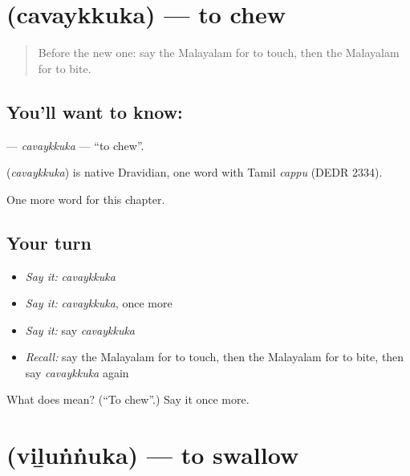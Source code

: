 \section[\texorpdfstring{\ml{ചവയ്ക്കുക} (cavaykkuka)}{ചവയ്ക്കുക (cavaykkuka)}]{ (cavaykkuka) — to chew}

\label{lesson:ML-C266-cavaykkuka}



\begin{quote}
Before the new one: say the Malayalam for to touch, then the Malayalam for to bite.
\end{quote}

\subsection*{You'll want to know: }
\textbf{} — \emph{cavaykkuka} — \textquotedblleft{}to chew\textquotedblright{}.

\begin{cousinweb}
\textbf{} (\emph{cavaykkuka}) is native Dravidian, one word with Tamil \emph{cappu} (DEDR 2334).
\end{cousinweb}

\begin{grammarlens}[title={What you've built}]
One more word for this chapter.
\end{grammarlens}

\subsection*{Your turn}
\begin{itemize}
\raggedright
  \item \emph{Say it:} \emph{cavaykkuka}
  \item \emph{Say it:} \emph{cavaykkuka}, once more
  \item \emph{Say it:} say \emph{cavaykkuka}
  \item \emph{Recall:} say the Malayalam for to touch, then the Malayalam for to bite, then say \emph{cavaykkuka} again
\end{itemize}

\begin{tcolorbox}[breakable,colback=teal!4,colframe=teal!35!black,title={Before you move on}]
What does  mean? (\textquotedblleft{}To chew\textquotedblright{}.) Say it once more.
\end{tcolorbox}
\section[\texorpdfstring{\ml{വിഴുങ്ങുക} (viḻuṅṅuka)}{വിഴുങ്ങുക (viḻuṅṅuka)}]{ (viḻuṅṅuka) — to swallow}

